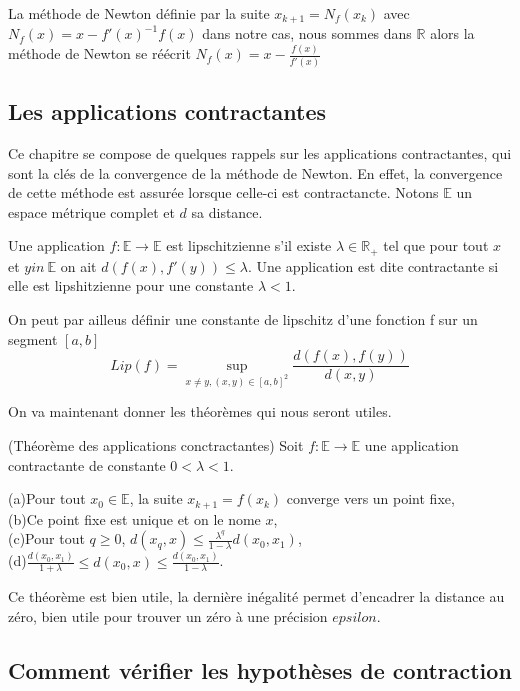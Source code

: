 \documentclass[a4paper,10.5pt]{article}
\begin{document}
	La méthode de Newton définie par la suite $x_{k+1}=N_{f}(x_{k})$ avec $N_{f}(x)=x-f'(x)^{-1}f(x)$ dans notre cas, nous sommes dans $\mathbb{R}$ alors la méthode de Newton se réécrit $N_{f}(x)=x-\frac{f(x)}{f'(x)}$ 
	
	\subsection{Les applications contractantes}
	
	Ce chapitre se compose de quelques rappels sur les applications contractantes, qui sont la clés de la convergence de la méthode de Newton. En effet, la convergence de cette méthode est assurée lorsque celle-ci est contractancte. 
	Notons $\mathbb{E}$ un espace métrique complet et $d$ sa distance.
	
	
	\begin{definition} Une application $f: \mathbb{E} \rightarrow \mathbb{E}$ est lipschitzienne s'il existe $\lambda \in \mathbb{R}_{+}$ tel que pour tout $x$ et $y in\ \mathbb{E}$ on ait $d(f(x),f'(y)) \leq \lambda$. Une application est dite contractante si elle est lipshitzienne pour une constante $\lambda <1$. 
	\end{definition}
	On peut par ailleus définir une constante de lipschitz d'une fonction f sur un segment $[a,b]$
	\[Lip(f)=\sup_{x \neq y,(x,y)\in [a,b]^2} \frac{d(f(x),f(y))}{d(x,y)}\]
	
	On va maintenant donner les théorèmes qui nous seront utiles.
	\begin{theorem}(Théorème des applications conctractantes) Soit $f:\mathbb{E} \rightarrow \mathbb{E}$ une application contractante de constante $0<\lambda<1$.
		
		(a)Pour tout $x_0 \in \mathbb{E}$, la suite $x_{k+1}=f(x_k)$ converge vers un point fixe,\\
		
		(b)Ce point fixe est unique et on le nome $x$,\\
		
		(c)Pour tout $q \geq 0$, $d(x_q,x) \leq \frac{\lambda^q}{1-\lambda} d(x_0,x_1)$,\\
		
		(d)$\frac{d(x_0,x_1)}{1+\lambda} \leq d(x_0,x) \leq \frac{d(x_0,x_1)}{1-\lambda}$.
	\end{theorem}
	Ce théorème est bien utile, la dernière inégalité permet d'encadrer la distance au zéro, bien utile pour trouver un zéro à une précision $epsilon$. 
	
	\subsection{Comment vérifier les hypothèses de contraction} 
	
\end{document}
